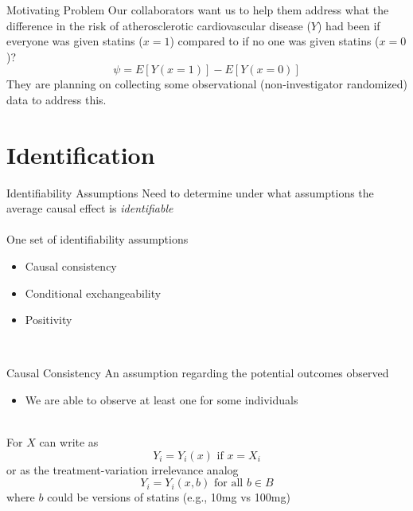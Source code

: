 \documentclass{beamer}
\begin{document}
\begin{frame}{Motivating Problem}
	Our collaborators want us to help them address what the difference in the risk of atherosclerotic cardiovascular disease ($Y$) had been if everyone was given statins ($x=1$) compared to if no one was given statins ($x=0$)? 
	\[\psi = E[Y(x=1)] - E[Y(x=0)]\]
	They are planning on collecting some observational (non-investigator randomized) data to address this.
\end{frame}

\section{Identification}

\begin{frame}{Identifiability Assumptions}
	Need to determine under what assumptions the average causal effect is \textit{identifiable}\\~\\
	One set of identifiability assumptions
	\begin{itemize}
		\item Causal consistency
		\item Conditional exchangeability
		\item Positivity
	\end{itemize}~\\
\end{frame}

\begin{frame}{Causal Consistency}
	An assumption regarding the potential outcomes observed
	\begin{itemize}
		\item We are able to observe at least one for some individuals
	\end{itemize}~\\
	For $X$ can write as
	$$Y_i = Y_i(x) \text{ if } x=X_i$$
	or as the treatment-variation irrelevance analog
	$$Y_i = Y_i(x, b) \text{ for all } b \in B$$
	where $b$ could be versions of statins (e.g., 10mg vs 100mg)
\end{frame}

\end{document}
